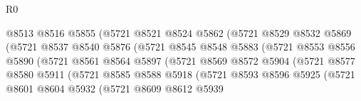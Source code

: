 \begin{lexlean}{R0}
\begin{coremodule}
                                  @8513
                                  @8516
                                  @5855
                                  (@5721
                                    @8521
                                    @8524
                                    @5862
                                    (@5721
                                      @8529
                                      @8532
                                      @5869
                                      (@5721
                                        @8537
                                        @8540
                                        @5876
                                        (@5721
                                          @8545
                                          @8548
                                          @5883
                                          (@5721
                                            @8553
                                            @8556
                                            @5890
                                            (@5721
                                              @8561
                                              @8564
                                              @5897
                                              (@5721
                                                @8569
                                                @8572
                                                @5904
                                                (@5721
                                                  @8577
                                                  @8580
                                                  @5911
                                                  (@5721
                                                    @8585
                                                    @8588
                                                    @5918
                                                    (@5721
                                                      @8593
                                                      @8596
                                                      @5925
                                                      (@5721
                                                        @8601
                                                        @8604
                                                        @5932
                                                        (@5721
                                                          @8609
                                                          @8612
                                                          @5939

\end{coremodule}
\end{lexlean}
